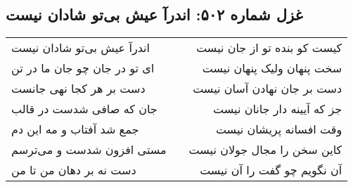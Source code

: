 \begin{center}
\section*{غزل شماره ۵۰۲: اندرآ عیش بی‌تو شادان نیست}
\label{sec:0502}
\begin{longtable}{l p{0.5cm} r}
اندرآ عیش بی‌تو شادان نیست
&&
کیست کو بنده تو از جان نیست
\\
ای تو در جان چو جان ما در تن
&&
سخت پنهان ولیک پنهان نیست
\\
دست بر هر کجا نهی جانست
&&
دست بر جان نهادن آسان نیست
\\
جان که صافی شدست در قالب
&&
جز که آیینه دار جانان نیست
\\
جمع شد آفتاب و مه این دم
&&
وقت افسانه پریشان نیست
\\
مستی افزون شدست و می‌ترسم
&&
کاین سخن را مجال جولان نیست
\\
دست نه بر دهان من تا من
&&
آن نگویم چو گفت را آن نیست
\\
\end{longtable}
\end{center}
